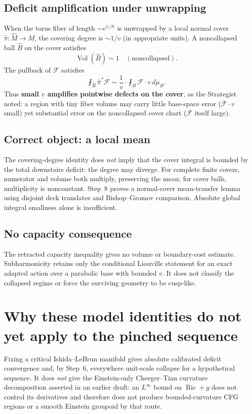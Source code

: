 \subsection*{Deficit amplification under unwrapping}
When the torus fiber of length $\sim v^{1/N}$ is unwrapped by a local
normal cover $\hat\pi:\hat M\to M$, the covering degree is $\sim1/v$
(in appropriate units).  A noncollapsed ball $\hat B$ on the cover
satisfies
\[
 \operatorname{Vol}(\hat B)\sim1
 \quad(\text{noncollapsed}).
\]
The pullback of $\mathcal F$ satisfies
\[
 \fint_{\hat B}\hat\pi^*\mathcal F
 \sim\frac{1}{v}\cdot\fint_{B}\mathcal F\cdot v\,d\mu_B.
\]
Thus \textbf{small $v$ amplifies pointwise defects on the cover}, as the
Strategist noted: a region with tiny fiber volume may carry little
base-space error ($\overline{\mathcal F}\cdot v$ small) yet substantial
error on the noncollapsed cover chart ($\overline{\mathcal F}$ itself
large).

\subsection*{Correct object: a local mean}
The covering-degree identity does \emph{not} imply that the cover integral is
bounded by the total downstairs deficit: the degree may diverge.  For complete
finite covers, numerator and volume both multiply, preserving the mean; for
cover balls, multiplicity is nonconstant.  Step~8 proves a normal-cover
mean-transfer lemma using disjoint deck translates and Bishop--Gromov
comparison.  Absolute global integral smallness alone is insufficient.

\subsection*{No capacity consequence}
The retracted capacity inequality gives no volume or boundary-cost estimate.
Subharmonicity retains only the conditional Liouville statement for an exact
adapted action over a parabolic base with bounded $v$.  It does not classify
the collapsed regime or force the surviving geometry to be cusp-like.

\section{Why these model identities do not yet apply to the pinched sequence}

Fixing a critical Ishida--LeBrun manifold gives absolute calibrated deficit
convergence and, by Step~6, everywhere unit-scale collapse for a hypothetical
sequence.  It does \emph{not} give the Einstein-only Cheeger--Tian curvature
decomposition asserted in an earlier draft: an $L^\infty$ bound on
$\operatorname{Ric}+g$ does not control its derivatives and therefore does not
produce bounded-curvature CFG regions or a smooth Einstein groupoid by that
route.


